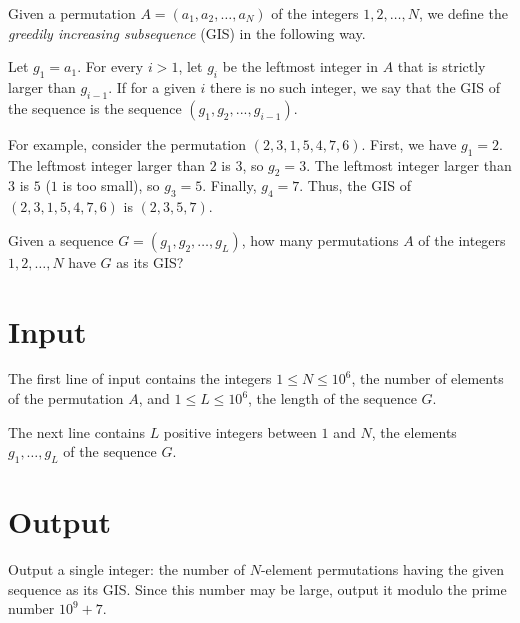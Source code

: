 Given a permutation $A = (a_1, a_2, \dots, a_N)$ of the integers $1, 2, \dots, N$, we define the \emph{greedily increasing subsequence} (GIS) in the following way.

Let $g_1 = a_1$. For every $i > 1$, let $g_i$ be the leftmost integer in $A$ that is strictly larger than $g_{i-1}$.
If for a given $i$ there is no such integer, we say that the GIS of the sequence is the sequence $(g_1, g_2, ..., g_{i - 1})$.

For example, consider the permutation $(2, 3, 1, 5, 4, 7, 6)$.
First, we have $g_1 = 2$.
The leftmost integer larger than $2$ is $3$, so $g_2 = 3$.
The leftmost integer larger than $3$ is $5$ ($1$ is too small), so $g_3 = 5$.
Finally, $g_4 = 7$.
Thus, the GIS of $(2, 3, 1, 5, 4, 7, 6)$ is $(2, 3, 5, 7)$.

Given a sequence $G = (g_1, g_2, \dots, g_L)$, how many permutations $A$ of the integers $1, 2, \dots, N$ have $G$ as its GIS?

\section*{Input}
The first line of input contains the integers $1 \le N \le 10^6$, the number of elements of the permutation $A$,
and $1 \le L \le 10^6$, the length of the sequence $G$.

The next line contains $L$ positive integers between $1$ and $N$, the elements $g_1, \dots, g_L$ of the sequence $G$.

\section*{Output}
Output a single integer: the number of $N$-element permutations having the given sequence as its GIS.
Since this number may be large, output it modulo the prime number $10^9 + 7$.
